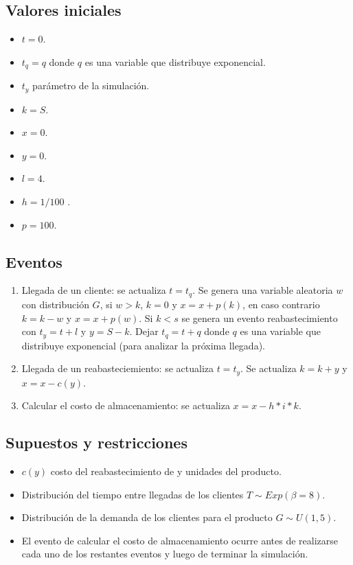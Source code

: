 \documentclass{article}
\begin{document}
\begin{itemize}
\subsection*{Valores iniciales}

\begin{itemize}
    \item $t=0$.
    \item $t_q=q$ donde $q$ es una variable que distribuye exponencial.
    \item $t_y$ parámetro de la simulación.
    \item $k=S$.
    \item $x=0$.
    \item $y=0$.
    \item $l=4$.
    \item $h=1/100$ .
    \item $p=100$.
\end{itemize}

\subsection*{Eventos}

\begin{enumerate}
    \item Llegada de un cliente: se actualiza $t=t_q$. Se genera una variable aleatoria $w$ con distribución $G$, si $w>k$, $k=0$ y $x=x+p(k)$, en caso contrario $k=k-w$ y $x=x+p(w)$. Si $k<s$ se genera un evento reabastecimiento con $t_y=t+l$ y $y=S-k$. Dejar $t_q=t+q$ donde $q$ es una variable que distribuye exponencial (para analizar la próxima llegada).
    \item Llegada de un reabasteciemiento: se actualiza $t=t_y$. Se actualiza $k=k+y$ y $x=x-c(y)$.
    \item Calcular el costo de almacenamiento: se actualiza $x=x-h*i*k$.
\end{enumerate}

\subsection*{Supuestos y restricciones}

\begin{itemize}
    \item $c(y)$ costo del reabastecimiento de y unidades del producto.
    \item  Distribución del tiempo entre llegadas de los clientes $T \sim Exp(\beta = 8)$.
    \item  Distribución de la demanda de los clientes para el producto $G \sim U(1,5)$.
    \item  El evento de calcular el costo de almacenamiento ocurre antes de realizarse cada uno de los restantes eventos y luego de terminar la simulación.


\end{itemize}
\end{itemize}
\end{document}
